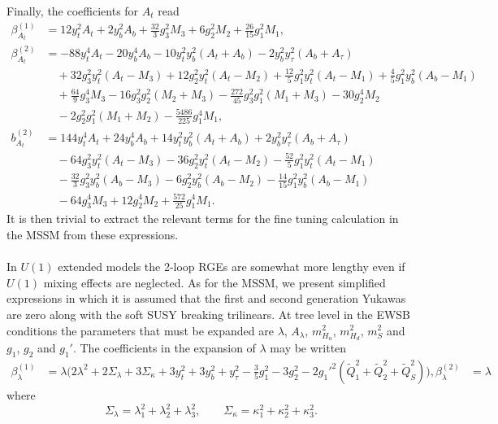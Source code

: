\documentclass[preprint,amsmath,amssymb,aps,superscriptaddress,prd,showpacs,floatfix]{revtex4-1}
\begin{document}
Finally, the coefficients for $A_t$ read
\begin{subequations}\label{eq:MSSMAtBetas}
\begin{align}
\beta_{A_t}^{(1)}&=12y_t^2A_t+2y_b^2A_b+\frac{32}{3}g_3^2M_3+6g_2^2M_2+\frac{26}{15}g_1^2M_1,\label{eq:MSSMAtbeta1}\\
\beta_{A_t}^{(2)}&=-88y_t^4A_t-20y_b^4A_b-10y_t^2y_b^2(A_t+A_b)-2y_b^2y_\tau^2(A_b+A_\tau)\nonumber\\
&\quad{}+32g_3^2y_t^2(A_t-M_3)+12g_2^2y_t^2(A_t-M_2)+\frac{12}{5}g_1^2y_t^2(A_t-M_1)+\frac{4}{5}g_1^2y_b^2(A_b-M_1)\nonumber\\
& \quad{}+\frac{64}{9}g_3^4M_3-16g_3^2g_2^2(M_2+M_3)-\frac{272}{45}g_3^2g_1^2(M_1+M_3)-30g_2^4M_2\nonumber\\
&\quad{}-2g_2^2g_1^2(M_1+M_2)-\frac{5486}{225}g_1^4M_1,\label{eq:MSSMAtbeta2}\\
b_{A_t}^{(2)}&=144y_t^4A_t+24y_b^4A_b+14y_t^2y_b^2(A_t+A_b)+2y_b^2y_\tau^2(A_b+A_\tau)\nonumber\\
&\quad{}-64g_3^2y_t^2(A_t-M_3)-36g_2^2y_t^2(A_t-M_2)-\frac{52}{5}g_1^2y_t^2(A_t-M_1)\nonumber\\
&\quad{}-\frac{32}{3}g_3^2y_b^2(A_b-M_3)-6g_2^2y_b^2(A_b-M_2)-\frac{14}{15}g_1^2y_b^2(A_b-M_1)\nonumber\\
&\quad{}-64g_3^4M_3+12g_2^4M_2+\frac{572}{25}g_1^4M_1.\label{eq:MSSMAtb2}
\end{align}
\end{subequations}
It is then trivial to extract the relevant terms for the fine tuning calculation in the MSSM from these expressions.\\ \\
In $U(1)$ extended models the 2-loop RGEs are somewhat more lengthy even if $U(1)$ mixing effects are
neglected. As for the MSSM, we present simplified expressions in which it is assumed that the first and 
second generation Yukawas are zero along with the soft SUSY breaking trilinears. At tree level in the EWSB conditions
the parameters that must be expanded are $\lambda$, $A_\lambda$, $m_{H_u}^2$, $m_{H_d}^2$, $m_S^2$ and $g_1$, $g_2$ and $g_1'$.
The coefficients in the expansion of $\lambda$ may be written
\begin{subequations}\label{eq:USSMLambdaBetas}
\begin{align}
\beta_{\lambda}^{(1)}&=\lambda\Big (2\lambda^2+2\Sigma_\lambda +3\Sigma_\kappa+ 3y_t^2 + 3y_b^2 + y_\tau^2-\frac{3}{5}g_1^2-3g_2^2-2g_1'^2\left (\tilde{Q}_1^2+\tilde{Q}_2^2+\tilde{Q}_S^2\right )\Big ), \label{eq:USSMLambdabeta1}
\beta_{\lambda}^{(2)}&=\lambda
\end{align}
\end{subequations}
where
\begin{equation*}
\Sigma_\lambda=\lambda_1^2+\lambda_2^2+\lambda_3^2,\qquad \Sigma_\kappa=\kappa_1^2+\kappa_2^2+\kappa_3^2.
\end{equation*}
{}
\end{document}
